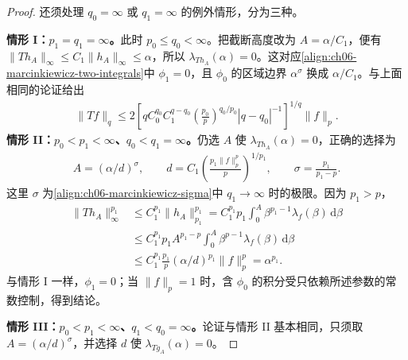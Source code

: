 \documentclass[../../main.tex]{subfiles}
\begin{document}
\begin{proof}
还须处理 $q_0=\infty$ 或 $q_1=\infty$ 的例外情形，分为三种。

\textbf{情形 I：$p_1=q_1=\infty$。}此时 $p_0\leqslant q_0<\infty$。把截断高度改为 $A=\alpha/C_1$，便有 $\|Th_A\|_\infty\leqslant C_1\|h_A\|_\infty\leqslant\alpha$，所以 $\lambda_{Th_A}(\alpha)=0$。这对应\cref{align:ch06-marcinkiewicz-two-integrals}中 $\phi_1=0$，且 $\phi_0$ 的区域边界 $\alpha^\sigma$ 换成 $\alpha/C_1$。与上面相同的论证给出
\begin{align*}
\|Tf\|_q\leqslant2\left[qC_0^{q_0}C_1^{q-q_0}
\left(\frac{p_0}p\right)^{q_0/p_0}|q-q_0|^{-1}\right]^{1/q}\|f\|_p.
\end{align*}
\textbf{情形 II：$p_0<p_1<\infty$、$q_0<q_1=\infty$。}仍选 $A$ 使 $\lambda_{Th_A}(\alpha)=0$，正确的选择为
\begin{align*}
A=(\alpha/d)^\sigma,\qquad
d=C_1\left(\frac{p_1\|f\|_p^p}p\right)^{1/p_1},\qquad
\sigma=\frac{p_1}{p_1-p}.
\end{align*}
这里 $\sigma$ 为\cref{align:ch06-marcinkiewicz-sigma}中 $q_1\to\infty$ 时的极限。因为 $p_1>p$，
\begin{align*}
\|Th_A\|_\infty^{p_1}
&\leqslant C_1^{p_1}\|h_A\|_{p_1}^{p_1}
=C_1^{p_1}p_1\int_0^A\beta^{p_1-1}\lambda_f(\beta)\,\mathrm d\beta\\
&\leqslant C_1^{p_1}p_1 A^{p_1-p}\int_0^A\beta^{p-1}\lambda_f(\beta)\,\mathrm d\beta\\
&\leqslant C_1^{p_1}\frac{p_1}p(\alpha/d)^{p_1}\|f\|_p^p=\alpha^{p_1}.
\end{align*}
与情形 I 一样，$\phi_1=0$；当 $\|f\|_p=1$ 时，含 $\phi_0$ 的积分受只依赖所述参数的常数控制，得到结论。

\textbf{情形 III：$p_0<p_1<\infty$、$q_1<q_0=\infty$。}论证与情形 II 基本相同，只须取 $A=(\alpha/d)^\sigma$，并选择 $d$ 使 $\lambda_{Tg_A}(\alpha)=0$。
\end{proof}
\end{document}

